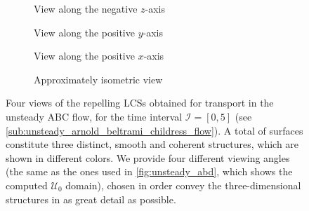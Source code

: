 \begin{figure}[htpb]
    \centering
    \hspace*{\fill}
    \begin{subfigure}[b]{0.42\textwidth}
        \centering
        \caption[]{{\small View along the negative $z$-axis}}
        \label{fig:unsteady_lcss_z}
    \end{subfigure}\hfill%
    \begin{subfigure}[b]{0.42\textwidth}
        \centering
        \caption[]{{\small View along the positive $y$-axis}}
        \label{fig:unsteady_lcss_y}
    \end{subfigure}%
    \hspace*{\fill}

    \hspace*{\fill}
    \begin{subfigure}[b]{0.42\textwidth}
        \centering
        \caption[]{{\small View along the positive $x$-axis}}
        \label{fig:unsteady_lcss_x}
    \end{subfigure}\hfill%
    \begin{subfigure}[b]{0.42\textwidth}
        \centering
        \caption[]{{\small Approximately isometric view}}
        \label{fig:unsteady_lcss_isometric}
    \end{subfigure}%
    \hspace*{\fill}
    \caption[Four views of the repelling LCSs obtained for transport in the
    unsteady ABC flow]
    {
        Four views of the repelling LCSs obtained for transport in the unsteady
        ABC flow, for the time interval $\mathcal{I}=[0,5]$ (see
        \cref{sub:unsteady_arnold_beltrami_childress_flow}). A total of
         surfaces constitute three distinct, smooth and coherent
        structures, which are shown in different colors. We provide four
        different viewing angles (the same as the ones used in
        \cref{fig:unsteady_abd}, which shows the computed $\mathcal{U}_{0}$
        domain), chosen in order convey the three-dimensional structures in as
        great detail as possible.
}
    \label{fig:unsteady_lcss}
\end{figure}

